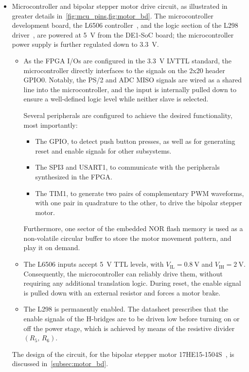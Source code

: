 \documentclass[]{article}
\begin{document}
\begin{itemize}
    \item Microcontroller and bipolar stepper motor drive circuit, as illustrated in greater details in~\cref{fig:mcu_pins,fig:motor_bd}.
    The microcontroller development board, the L6506 controller~\cite{l6506}, and the logic section of the L298 driver~\cite{l298}, are powered at \qty{5}{\V} from the DE1-SoC board; the microcontroller power supply is further regulated down to \qty{3.3}{\V}.
    \begin{itemize}
        \item As the FPGA I/Os are configured in the \qty{3.3}{\V} LVTTL standard, the microcontroller directly interfaces to the signals on the 2x20 header GPIO0. Notably, the PS/2 and ADC MISO signals are wired as a shared line into the microcontroller, and the input is internally pulled down to ensure a well-defined logic level while neither slave is selected.

        Several peripherals are configured to achieve the desired functionality, most importantly:
        \begin{itemize}
            \item The GPIO, to detect push button presses, as well as for generating reset and enable signals for other subsystems.
            \item The SPI3 and USART1, to communicate with the peripherals synthesized in the FPGA.
            \item The TIM1, to generate two pairs of complementary PWM waveforms, with one pair in quadrature to the other, to drive the bipolar stepper motor.
        \end{itemize}
        Furthermore, one sector of the embedded NOR flash memory is used as a non-volatile circular buffer to store the motor movement pattern, and play it on demand.
        
        \item The L6506 inputs accept \qty{5}{\V} TTL levels, with $V_\text{IL} = \qty{0.8}{\V}$ and $V_\text{IH} = \qty{2}{\V}$. Consequently, the microcontroller can reliably drive them, without requiring any additional translation logic. During reset, the enable signal is pulled down with an external resistor and forces a motor brake.

        \item The L298 is permanently enabled. The datasheet prescribes that the enable signals of the H-bridges are to be driven low before turning on or off the power stage, which is achieved by means of the resistive divider $(R_5,\,R_6)$. 
    \end{itemize}
    The design of the circuit, for the bipolar stepper motor 17HE15-1504S~\cite{stepp}, is discussed in~\cref{subsec:motor_bd}.
\end{itemize}
\end{document}
